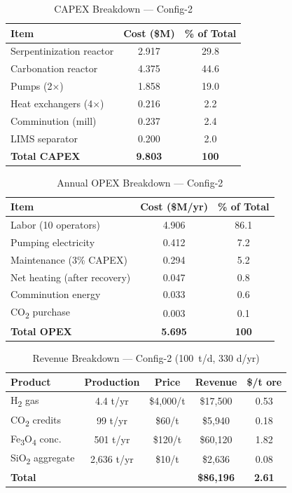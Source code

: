 \documentclass[11pt,a4paper]{article}
\begin{document}
\begin{table}[H]
\centering
\caption{CAPEX Breakdown --- Config-2}
\label{tab:capex}
\begin{tabular}{lcc}
\toprule
\textbf{Item}              & \textbf{Cost (\$M)} & \textbf{\% of Total} \\
\midrule
Serpentinization reactor   & 2.917 & 29.8 \\
Carbonation reactor        & 4.375 & 44.6 \\
Pumps (2$\times$)          & 1.858 & 19.0 \\
Heat exchangers (4$\times$)& 0.216 & 2.2 \\
Comminution (mill)         & 0.237 & 2.4 \\
LIMS separator             & 0.200 & 2.0 \\
\midrule
\textbf{Total CAPEX}       & \textbf{9.803} & \textbf{100} \\
\bottomrule
\end{tabular}
\end{table}

\begin{table}[H]
\centering
\caption{Annual OPEX Breakdown --- Config-2}
\label{tab:opex}
\begin{tabular}{lcc}
\toprule
\textbf{Item}              & \textbf{Cost (\$M/yr)} & \textbf{\% of Total} \\
\midrule
Labor (10 operators)       & 4.906 & 86.1 \\
Pumping electricity        & 0.412 & 7.2 \\
Maintenance (3\% CAPEX)    & 0.294 & 5.2 \\
Net heating (after recovery) & 0.047 & 0.8 \\
Comminution energy         & 0.033 & 0.6 \\
CO\textsubscript{2} purchase & 0.003 & 0.1 \\
\midrule
\textbf{Total OPEX}        & \textbf{5.695} & \textbf{100} \\
\bottomrule
\end{tabular}
\end{table}

\begin{table}[H]
\centering
\caption{Revenue Breakdown --- Config-2 (\SI{100}{t/d}, 330 d/yr)}
\label{tab:revenue}
\begin{tabular}{lcccc}
\toprule
\textbf{Product}  & \textbf{Production} & \textbf{Price} & \textbf{Revenue} & \textbf{\$/t ore} \\
\midrule
H\textsubscript{2} gas        & 4.4 t/yr   & \$4,000/t   & \$17,500   & 0.53 \\
CO\textsubscript{2} credits    & 99 t/yr    & \$60/t      & \$5,940    & 0.18 \\
Fe\textsubscript{3}O\textsubscript{4} conc. & 501 t/yr & \$120/t  & \$60,120   & 1.82 \\
SiO\textsubscript{2} aggregate & 2,636 t/yr & \$10/t      & \$2,636    & 0.08 \\
\midrule
\textbf{Total}                 &             &             & \textbf{\$86,196} & \textbf{2.61} \\
\bottomrule
\end{tabular}
\end{table}
\end{document}
